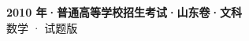 \documentclass[zihao=-4, a4paper]{ctexart}
\begin{document}
\begin{center}
  {\Large\bfseries 2010 年·普通高等学校招生考试·山东卷·文科}\\[4pt]
  {\large 数学 · 试题版}
\end{center}
\medskip
{}

\end{document}

